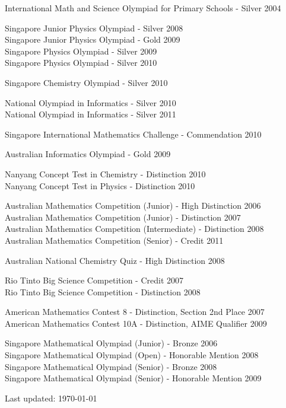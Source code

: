 \documentclass[letterpaper]{article}
\def\footerlink{}
\renewenvironment{itemize}{
  \begin{list}{}{
    \setlength{\leftmargin}{1.5em}
  }
}{
  \end{list}
}
\begin{document}
\begin{itemize}
  \item International Math and Science Olympiad for Primary Schools - Silver \hfill 2004
  \item Singapore Junior Physics Olympiad - Silver \hfill 2008
  \\    Singapore Junior Physics Olympiad - Gold \hfill 2009
  \\    Singapore Physics Olympiad - Silver \hfill 2009
  \\    Singapore Physics Olympiad - Silver \hfill 2010
  \item Singapore Chemistry Olympiad - Silver \hfill 2010
  \item National Olympiad in Informatics - Silver \hfill 2010 \\
        National Olympiad in Informatics - Silver \hfill 2011
  \item Singapore International Mathematics Challenge - Commendation \hfill 2010
  \item Australian Informatics Olympiad - Gold \hfill 2009
  \item Nanyang Concept Test in Chemistry - Distinction \hfill 2010 \\
        Nanyang Concept Test in Physics - Distinction \hfill 2010
  \item Australian Mathematics Competition (Junior) - High Distinction \hfill 2006
  \\    Australian Mathematics Competition (Junior) - Distinction \hfill 2007
  \\    Australian Mathematics Competition (Intermediate) - Distinction \hfill 2008
  \\    Australian Mathematics Competition (Senior) - Credit \hfill 2011
  \item Australian National Chemistry Quiz - High Distinction \hfill 2008
  \item Rio Tinto Big Science Competition - Credit \hfill 2007
  \\    Rio Tinto Big Science Competition - Distinction \hfill 2008
  \item American Mathematics Contest 8 - Distinction, Section 2nd Place \hfill 2007
  \\    American Mathematics Contest 10A - Distinction, AIME Qualifier \hfill 2009
  \item Singapore Mathematical Olympiad (Junior) - Bronze \hfill 2006
  \\    Singapore Mathematical Olympiad (Open) - Honorable Mention \hfill 2008
  \\    Singapore Mathematical Olympiad (Senior) - Bronze \hfill 2008
  \\    Singapore Mathematical Olympiad (Senior) - Honorable Mention \hfill 2009
\end{itemize}

\bigskip


\begin{center}
  \begin{footnotesize}
    Last updated: \today \\
    \href{\footerlink}{\texttt{\footerlink}}
  \end{footnotesize}
\end{center}
\end{document}
